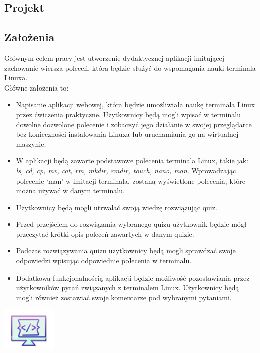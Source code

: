 \documentclass[10pt,a4paper]{report}
\begin{document}
\begin{adjustwidth}{2cm}{2cm}
\chapter{Projekt}
\section{Założenia}
\begin{minipage}{1\linewidth}
Głównym celem pracy jest utworzenie dydaktycznej aplikacji imitującej zachowanie wiersza poleceń, która będzie służyć do wspomagania nauki terminala Linuxa. \\
\vspace{0.3cm}
Główne założenia to:
\begin{itemize}
\setlength\itemsep{0.3cm}
    \item[\ding{118}] Napisanie aplikacji webowej, która będzie  umożliwiała naukę terminala Linux przez ćwiczenia praktyczne. Użytkownicy będą mogli wpisać w terminalu dowolne dozwolone polecenie i zobaczyć jego działanie w swojej przeglądarce  bez konieczności instalowania Linuxa lub uruchamiania go na wirtualnej maszynie. 
    \item[\ding{118}] W aplikacji będą zawarte podstawowe polecenia terminala Linux, takie jak: \textit{ls, cd, cp, mv, cat, rm, mkdir, rmdir, touch, nano, man}. Wprowadzając polecenie ‘man’ w imitacji terminala, zostaną wyświetlone polecenia, które można używać w danym terminalu.
    \item[\ding{118}] Użytkownicy będą mogli utrwalać swoją wiedzę rozwiązując quiz. 
    \item[\ding{118}] Przed przejściem do rozwiązania wybranego quizu użytkownik będzie mógł przeczytać krótki opis poleceń zawartych w danym quizie.
    \item[\ding{118}] Podczas rozwiązywania quizu użytkownicy będą mogli sprawdzać swoje odpowiedzi wpisując odpowiednie polecenia w terminalu.
    \item[\ding{118}] Dodatkową funkcjonalnością aplikacji będzie możliwość pozostawiania przez użytkowników pytań związanych z terminalem Linux. Użytkownicy będą mogli również zostawiać swoje komentarze pod wybranymi pytaniami.
\end{itemize}
\end{minipage}
 \begin{minipage}{\linewidth}
\begin{center}
  \includegraphics[width=100px]{project/logo.png} 
\end{center}
\end{minipage}

\end{adjustwidth}
\end{document}
